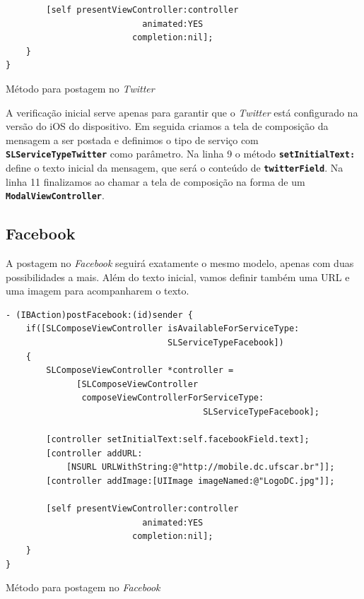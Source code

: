 \documentclass[a4paper,12pt,brazil,doubleside]{book}
\begin{document}
\begin{singlespace}
\begin{listing}[H]
\begin{verbatim}
        [self presentViewController:controller
                           animated:YES
                         completion:nil];
    }
}
\end{verbatim}
\caption{Método para postagem no \emph{Twitter}}
\end{listing}


A verificação inicial serve apenas para garantir que o \emph{Twitter} está configurado na versão do iOS do dispositivo. Em seguida criamos a tela de composição da mensagem a ser postada e definimos o tipo de serviço com \texttt{\textbf{SLServiceTypeTwitter}} como parâmetro. Na linha 9 o método \texttt{\textbf{setInitialText:}} define o texto inicial da mensagem, que será o conteúdo de \texttt{\textbf{twitterField}}. Na linha 11 finalizamos ao chamar a tela de composição na forma de um \texttt{\textbf{ModalViewController}}.

\bigskip

\subsection{Facebook}


A postagem no \emph{Facebook} seguirá exatamente o mesmo modelo, apenas com duas possibilidades a mais. Além do texto inicial, vamos definir também uma URL e uma imagem para acompanharem o texto.

\begin{listing}[H]
\begin{verbatim}
- (IBAction)postFacebook:(id)sender {
    if([SLComposeViewController isAvailableForServiceType:
                                SLServiceTypeFacebook])
    {
        SLComposeViewController *controller =
              [SLComposeViewController
               composeViewControllerForServiceType:
                                       SLServiceTypeFacebook];
        
        [controller setInitialText:self.facebookField.text];
        [controller addURL:
            [NSURL URLWithString:@"http://mobile.dc.ufscar.br"]];
        [controller addImage:[UIImage imageNamed:@"LogoDC.jpg"]];

        [self presentViewController:controller
                           animated:YES
                         completion:nil];
    }
}
\end{verbatim}
\caption{Método para postagem no \emph{Facebook}}
\end{listing}



\end{singlespace}
\end{document}

